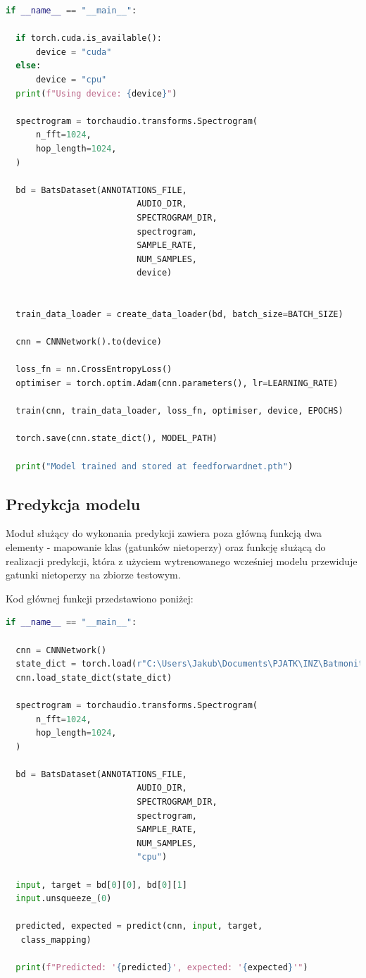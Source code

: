 \documentclass{sprz}
\begin{document}
\begin{lstlisting}[language=Python,caption={Implementacja modułu do trenowania sieci}, label={lst:train}]
  if __name__ == "__main__":

  if torch.cuda.is_available():
      device = "cuda"
  else:
      device = "cpu"
  print(f"Using device: {device}")

  spectrogram = torchaudio.transforms.Spectrogram(
      n_fft=1024,
      hop_length=1024,
  )

  bd = BatsDataset(ANNOTATIONS_FILE,
                          AUDIO_DIR,
                          SPECTROGRAM_DIR, 
                          spectrogram, 
                          SAMPLE_RATE,
                          NUM_SAMPLES,
                          device)


  train_data_loader = create_data_loader(bd, batch_size=BATCH_SIZE)

  cnn = CNNNetwork().to(device)

  loss_fn = nn.CrossEntropyLoss()
  optimiser = torch.optim.Adam(cnn.parameters(), lr=LEARNING_RATE)

  train(cnn, train_data_loader, loss_fn, optimiser, device, EPOCHS)

  torch.save(cnn.state_dict(), MODEL_PATH)

  print("Model trained and stored at feedforwardnet.pth")
\end{lstlisting}

\subsection{Predykcja modelu}
Moduł służący do wykonania predykcji zawiera poza główną funkcją dwa elementy - mapowanie klas (gatunków nietoperzy) oraz funkcję służącą do realizacji predykcji, która z użyciem wytrenowanego wcześniej modelu przewiduje gatunki nietoperzy na zbiorze testowym.

Kod głównej funkcji przedstawiono poniżej:

\begin{lstlisting}[language=Python,caption={Implementacja modułu do trenowania sieci}, label={lst:train}]
  if __name__ == "__main__":

  cnn = CNNNetwork()
  state_dict = torch.load(r"C:\Users\Jakub\Documents\PJATK\INZ\Batmonit_model\feedforwardnet.pth", map_location=torch.device('cpu'))
  cnn.load_state_dict(state_dict)

  spectrogram = torchaudio.transforms.Spectrogram(
      n_fft=1024,
      hop_length=1024,
  )

  bd = BatsDataset(ANNOTATIONS_FILE,
                          AUDIO_DIR,
                          SPECTROGRAM_DIR, 
                          spectrogram, 
                          SAMPLE_RATE,
                          NUM_SAMPLES,
                          "cpu")

  input, target = bd[0][0], bd[0][1]
  input.unsqueeze_(0)

  predicted, expected = predict(cnn, input, target,
   class_mapping)

  print(f"Predicted: '{predicted}', expected: '{expected}'")
\end{lstlisting}
\end{document}
